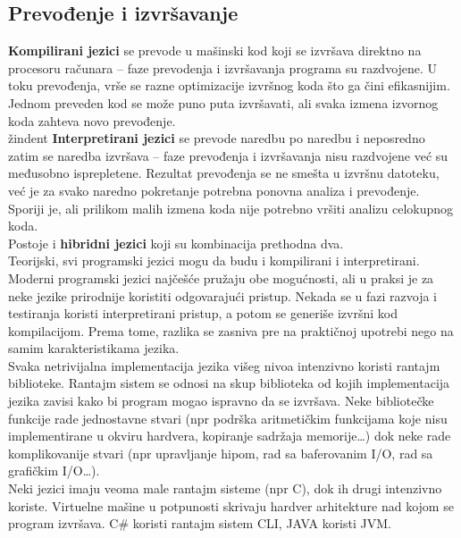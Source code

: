 \documentclass[../main.tex]{subfiles}
\begin{document}
\subsection{Prevođenje i izvršavanje}
{\bf Kompilirani jezici} se prevode u mašinski kod koji se izvršava direktno na procesoru računara -- faze prevodenja i izvršavanja programa su razdvojene. U toku prevođenja, vrše se razne optimizacije izvršnog koda što ga čini efikasnijim. Jednom preveden kod se može puno puta izvršavati, ali svaka izmena izvornog koda zahteva novo prevođenje.
\\
žindent {\bf Interpretirani jezici} se prevode naredbu po naredbu i neposredno zatim se naredba izvršava -- faze prevođenja i izvršavanja nisu razdvojene već su međusobno isprepletene. Rezultat prevođenja se ne smešta u izvršnu datoteku, već je za svako naredno pokretanje potrebna ponovna analiza i prevođenje. Sporiji je, ali prilikom malih izmena koda nije potrebno vršiti analizu celokupnog koda.
\\
Postoje i {\bf hibridni jezici} koji su kombinacija prethodna dva.
\\
Teorijski, svi programski jezici mogu da budu i kompilirani i interpretirani. Moderni programski jezici najčešće pružaju obe mogućnosti, ali u praksi je za neke jezike prirodnije koristiti odgovarajući pristup. Nekada se u fazi razvoja i testiranja koristi interpretirani pristup, a potom se generiše izvršni kod kompilacijom. Prema tome, razlika se zasniva pre na praktičnoj upotrebi nego na samim karakteristikama jezika.
\\
\indent Svaka netrivijalna implementacija jezika višeg nivoa intenzivno koristi rantajm biblioteke. Rantajm sistem se odnosi na skup biblioteka od kojih implementacija jezika zavisi kako bi program mogao ispravno da se izvršava. Neke bibliotečke funkcije rade jednostavne stvari (npr podrška aritmetičkim funkcijama koje nisu implementirane u okviru hardvera, kopiranje sadržaja memorije\ldots) dok neke rade komplikovanije stvari (npr upravljanje hipom, rad sa baferovanim I/O, rad sa grafičkim I/O\ldots).
\\
Neki jezici imaju veoma male rantajm sisteme (npr C), dok ih drugi intenzivno koriste. Virtuelne mašine u potpunosti skrivaju hardver arhitekture nad kojom se program izvršava. C\# koristi rantajm sistem CLI, JAVA koristi JVM.
\end{document}
